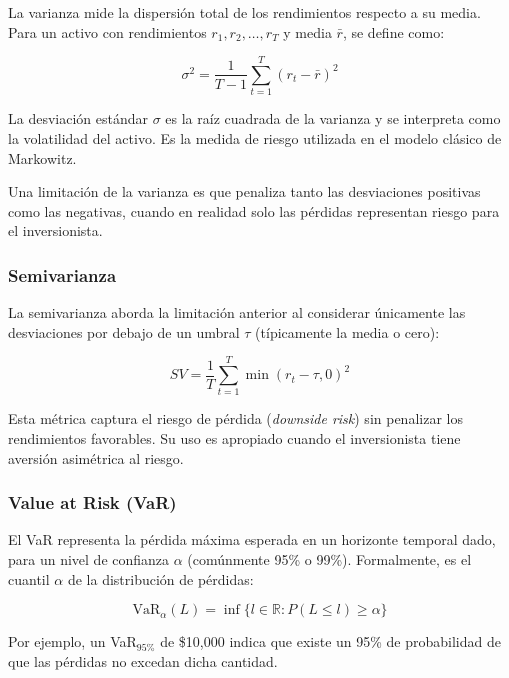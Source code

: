 \documentclass[12pt]{article}
\begin{document}
La varianza mide la dispersión total de los rendimientos respecto a
su media. Para un activo con rendimientos $r_1, r_2, \ldots, r_T$ y
media $\bar{r}$, se define como:

\begin{equation}
  \sigma^2 = \frac{1}{T-1} \sum_{t=1}^{T} (r_t - \bar{r})^2
\end{equation}

La desviación estándar $\sigma$ es la raíz cuadrada de la varianza y
se interpreta como la volatilidad del activo. Es la medida de riesgo
utilizada en el modelo clásico de Markowitz.

Una limitación de la varianza es que penaliza tanto las desviaciones
positivas como las negativas, cuando en realidad solo las pérdidas
representan riesgo para el inversionista.

\subsubsection{Semivarianza}

La semivarianza aborda la limitación anterior al considerar
únicamente las desviaciones por debajo de un umbral $\tau$
(típicamente la media o cero):

\begin{equation}
  SV = \frac{1}{T} \sum_{t=1}^{T} \min(r_t - \tau, 0)^2
\end{equation}

Esta métrica captura el riesgo de pérdida (\textit{downside risk})
sin penalizar los rendimientos favorables. Su uso es apropiado cuando
el inversionista tiene aversión asimétrica al riesgo.

\subsubsection{Value at Risk (VaR)}

El VaR representa la pérdida máxima esperada en un horizonte temporal
dado, para un nivel de confianza $\alpha$ (comúnmente 95\% o 99\%).
Formalmente, es el cuantil $\alpha$ de la distribución de pérdidas:

\begin{equation}
  \mathrm{VaR}_{\alpha}(L) = \inf \{ l \in \mathbb{R} : P(L \leq l)
  \geq \alpha \}
\end{equation}

Por ejemplo, un VaR$_{95\%}$ de \$10,000 indica que existe un 95\% de
probabilidad de que las pérdidas no excedan dicha cantidad.
\end{document}
